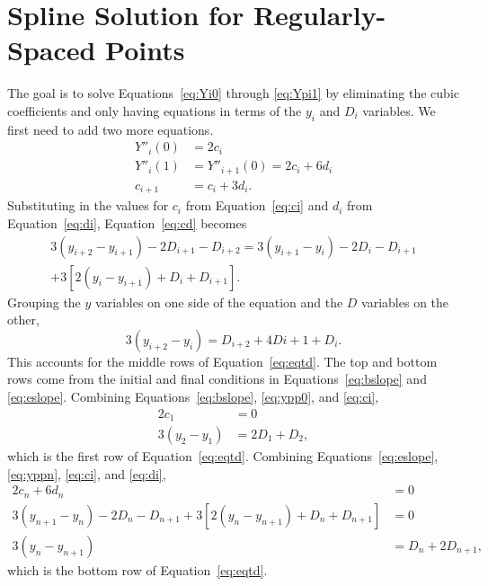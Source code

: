 \documentclass{scrartcl}
\begin{document}
\section{Spline Solution for Regularly-Spaced Points}\label{sec:reg-deriv}
The goal is to solve Equations~\ref{eq:Yi0} through \ref{eq:Ypi1}
by eliminating the cubic coefficients and only having equations
in terms of the $y_i$ and $D_i$ variables. We first need to
add two more equations.
\begin{align}
Y''_i(0) &= 2c_i\label{eq:ypp0}\\
Y''_i(1) &= Y''_{i+1}(0) = 2c_i+6d_i\label{eq:yppn}\\
c_{i+1} &= c_i + 3d_i. \label{eq:cd}
\end{align}
Substituting in the values for $c_i$ from Equation~\ref{eq:ci} and
$d_i$ from Equation~\ref{eq:di}, Equation~\ref{eq:cd} becomes
\begin{multline}
3(y_{i+2}-y_{i+1})-2D_{i+1}-D_{i+2} = 3(y_{i+1}-y_i)-2D_i-D_{i+1}\\
	+3[2(y_i-y_{i+1})+D_i+D_{i+1}].
\end{multline}
Grouping the $y$ variables on one side of the equation and the $D$
variables on the other,
\begin{equation}
3(y_{i+2}-y_i) = D_{i+2} +4D{i+1} +D_i.
\end{equation}
This accounts for the middle rows of Equation~\ref{eq:eqtd}. The
top and bottom rows come from the initial and final conditions
in Equations~\ref{eq:bslope} and \ref{eq:eslope}. Combining
Equations~\ref{eq:bslope}, \ref{eq:ypp0}, and \ref{eq:ci},
\begin{align}
2c_1 & = 0\\
3(y_2-y_1) &= 2D_1 + D_2,
\end{align}
which is the first row of Equation~\ref{eq:eqtd}. Combining
Equations~\ref{eq:eslope}, \ref{eq:yppn}, \ref{eq:ci}, and
\ref{eq:di},
\begin{align}
2c_n+6d_n &= 0\\
3(y_{n+1}-y_n)-2D_n-D_{n+1}+3[2(y_n-y_{n+1})+D_n+D_{n+1}] &= 0\\
3(y_n-y_{n+1}) &= D_n+2D_{n+1},
\end{align}
which is the bottom row of Equation~\ref{eq:eqtd}.
\end{document}
